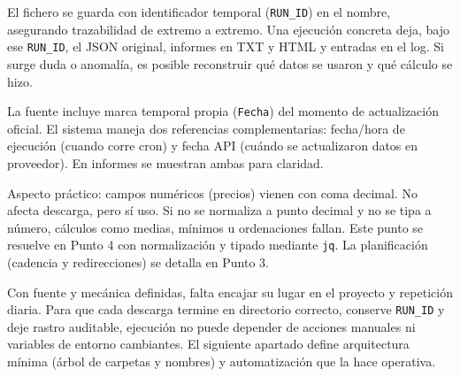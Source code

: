 El fichero se guarda con identificador temporal (\texttt{RUN\_ID}) en el nombre, asegurando trazabilidad de extremo a extremo. Una ejecución concreta deja, bajo ese \texttt{RUN\_ID}, el JSON original, informes en TXT y HTML y entradas en el log. Si surge duda o anomalía, es posible reconstruir qué datos se usaron y qué cálculo se hizo.

La fuente incluye marca temporal propia (\texttt{Fecha}) del momento de actualización oficial. El sistema maneja dos referencias complementarias: fecha/hora de ejecución (cuando corre cron) y fecha API (cuándo se actualizaron datos en proveedor). En informes se muestran ambas para claridad.

Aspecto práctico: campos numéricos (precios) vienen con coma decimal. No afecta descarga, pero sí uso. Si no se normaliza a punto decimal y no se tipa a número, cálculos como medias, mínimos u ordenaciones fallan. Este punto se resuelve en Punto 4 con normalización y tipado mediante \texttt{jq}. La planificación (cadencia y redirecciones) se detalla en Punto 3.

Con fuente y mecánica definidas, falta encajar su lugar en el proyecto y repetición diaria. Para que cada descarga termine en directorio correcto, conserve \texttt{RUN\_ID} y deje rastro auditable, ejecución no puede depender de acciones manuales ni variables de entorno cambiantes. El siguiente apartado define arquitectura mínima (árbol de carpetas y nombres) y automatización que la hace operativa.
